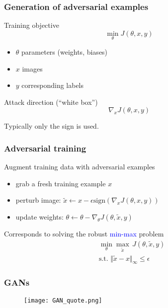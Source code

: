 \documentclass[aspectratio=149]{beamer}
\begin{document}
\begin{frame}
  \frametitle{Generation of adversarial examples}
  \begin{block}{Training objective}
    \begin{equation}
      \min_\theta J(\theta, x, y)
    \end{equation}
    \begin{itemize}
      \item $\theta$ parameters (weights, biases)
      \item $x$ images
      \item $y$ corresponding labels
    \end{itemize}
  \end{block}
  \begin{block}{Attack direction (``white box'')}
    \begin{equation}
      \nabla_x J(\theta, x, y)
    \end{equation}
  \end{block}
  Typically only the sign is used.
\end{frame}

\begin{frame}
  \frametitle{Adversarial training}

  \begin{block}{Augment training data with adversarial examples}
    \begin{itemize}
      \item grab a fresh training example $x$
      \item perturb image: $\tilde{x} \leftarrow x - \epsilon \text{sign}(\nabla_x J(\theta, x, y))$
      \item update weights:  $\theta \leftarrow \theta - \nabla_\theta J(\theta, \tilde{x}, y)$
    \end{itemize}
  \end{block}

  Corresponds to solving the robust \textcolor{blue}{min-max} problem
  \begin{align}
    &\min_\theta \max_{\tilde{x}} \, J(\theta, \tilde{x}, y) \\
    &\text{s.t. } \Vert \tilde{x}-x \Vert_\infty \le \epsilon
  \end{align}
\end{frame}


\begin{frame}
  \frametitle{GANs}
  \begin{figure}[ht]
    \centering
    \texttt{[image: GAN\_quote.png]}
  \end{figure}
\end{frame}
\end{document}
